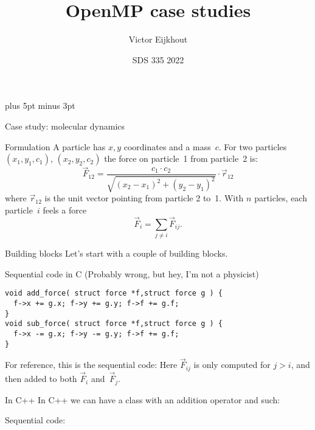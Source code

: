 \documentclass[11pt,headernav]{beamer}
\begin{document}
\parskip=10pt plus 5pt minus 3pt

\title{OpenMP case studies}
\author{Victor Eijkhout}
\date{SDS 335 2022}

\begin{frame}{}
  \titlepage
\end{frame}

\begin{frame}{Case study: molecular dynamics}
\end{frame}

\begin{numberedframe}{Formulation}
A particle has $x,y$ coordinates and a mass~$c$.
For two particles $(x_1,y_1,c_1)$, $(x_2,y_2,c_2)$
the force on particle~1 from particle~2 is:
\[ \overrightarrow F_{12} = \frac{c_1\cdot c_2}{\sqrt{ (x_2-x_1)^2+(y_2-y_1)^2 }} \cdot \overrightarrow r_{12} \]
where $\overrightarrow r_{12}$ is the unit vector pointing from particle 2 to~1.
With $n$ particles, each particle~$i$ feels a force
\[ \overrightarrow F_i = \sum_{j\not=i} \overrightarrow F_{ij}.\]
\end{numberedframe}

\begin{numberedframe}{Building blocks}
Let's start with a couple of building blocks.
\end{numberedframe}

\begin{numberedframe}{Sequential code in C}
  (Probably wrong, but hey, I'm not a physicist)
  
\begin{lstlisting}
void add_force( struct force *f,struct force g ) {
  f->x += g.x; f->y += g.y; f->f += g.f;
}
void sub_force( struct force *f,struct force g ) {
  f->x -= g.x; f->y -= g.y; f->f += g.f;
}
\end{lstlisting}

For reference, this is the sequential code:
Here $\overrightarrow F_{ij}$ is only computed for $j>i$, and then
added to both $\overrightarrow F_i$ and~$\overrightarrow F_j$.
\end{numberedframe}

\begin{numberedframe}{In C++}
In C++ we can have a class with an addition operator and such:
%

Sequential code:
\end{numberedframe}
\end{document}
